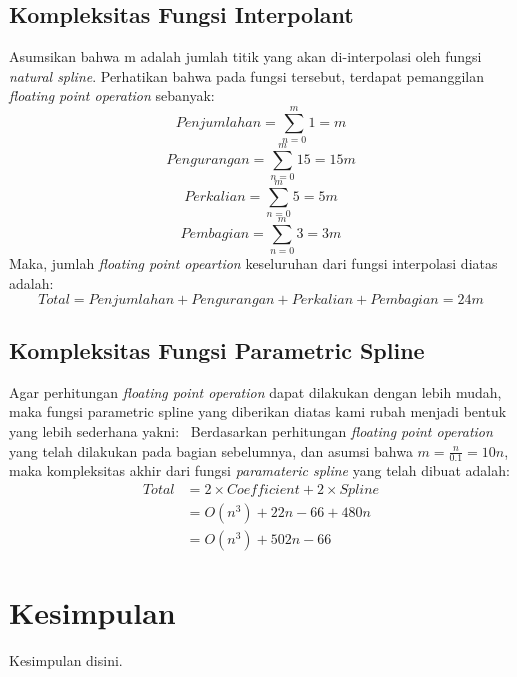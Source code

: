 \documentclass[journal,12pt,onecolumn,a4paper]{IEEEtran}
\begin{document}
\subsection{Kompleksitas Fungsi Interpolant}

Asumsikan bahwa m adalah jumlah titik yang akan di-interpolasi oleh fungsi \emph{natural spline}. Perhatikan bahwa pada fungsi tersebut, terdapat pemanggilan \emph{floating point operation} sebanyak:
\begin{equation}
	Penjumlahan = \sum_{n=0}^{m} 1 = m
\end{equation}
\begin{equation}
	Pengurangan = \sum_{n=0}^{m} 15 = 15m
\end{equation}
\begin{equation}
	Perkalian = \sum_{n=0}^{m} 5 = 5m
\end{equation}
\begin{equation}
	Pembagian = \sum_{n=0}^{m} 3 = 3m
\end{equation}
Maka, jumlah \emph{floating point opeartion} keseluruhan dari fungsi interpolasi diatas adalah:
\begin{equation}
	Total = Penjumlahan + Pengurangan + Perkalian + Pembagian = 24m
\end{equation}

\subsection{Kompleksitas Fungsi Parametric Spline}
Agar perhitungan \emph{floating point operation} dapat dilakukan dengan lebih mudah, maka fungsi parametric spline yang diberikan diatas kami rubah menjadi bentuk yang lebih sederhana yakni:
\
Berdasarkan perhitungan \emph{floating point operation} yang telah dilakukan pada bagian sebelumnya, dan asumsi bahwa \(m = \frac{n}{0.1} = 10n\), maka kompleksitas akhir dari fungsi \emph{paramateric spline} yang telah dibuat adalah:
\begin{equation}
	\begin{split}
		Total & = 2 \times Coefficient + 2 \times Spline\\
		& = O(n^3) + 22n - 66 + 480n\\
		& = O(n^3) + 502n - 66
	\end{split}
\end{equation}


\section{Kesimpulan}
Kesimpulan disini.
\end{document}

